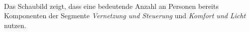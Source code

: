         \\
        Das Schaubild zeigt, dass eine bedeutende Anzahl an Personen bereits Komponenten der Segmente 
        \textit{Vernetzung und Steuerung} und \textit{Komfort und Licht} nutzen. 
        \\
        \linebreak
